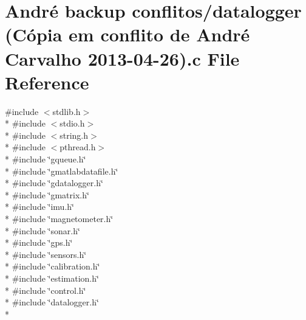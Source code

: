 \hypertarget{datalogger_01_07C_xC3_xB3pia_01em_01conflito_01de_01Andr_xC3_xA9_01Carvalho_012013-04-26_08_8c}{\section{André backup conflitos/datalogger (Cópia em conflito de André Carvalho 2013-\/04-\/26).c File Reference}
\label{datalogger_01_07C_xC3_xB3pia_01em_01conflito_01de_01Andr_xC3_xA9_01Carvalho_012013-04-26_08_8c}
}
{\ttfamily \#include $<$stdlib.\-h$>$}\\*
{\ttfamily \#include $<$stdio.\-h$>$}\\*
{\ttfamily \#include $<$string.\-h$>$}\\*
{\ttfamily \#include $<$pthread.\-h$>$}\\*
{\ttfamily \#include \char`\"{}gqueue.\-h\char`\"{}}\\*
{\ttfamily \#include \char`\"{}gmatlabdatafile.\-h\char`\"{}}\\*
{\ttfamily \#include \char`\"{}gdatalogger.\-h\char`\"{}}\\*
{\ttfamily \#include \char`\"{}gmatrix.\-h\char`\"{}}\\*
{\ttfamily \#include \char`\"{}imu.\-h\char`\"{}}\\*
{\ttfamily \#include \char`\"{}magnetometer.\-h\char`\"{}}\\*
{\ttfamily \#include \char`\"{}sonar.\-h\char`\"{}}\\*
{\ttfamily \#include \char`\"{}gps.\-h\char`\"{}}\\*
{\ttfamily \#include \char`\"{}sensors.\-h\char`\"{}}\\*
{\ttfamily \#include \char`\"{}calibration.\-h\char`\"{}}\\*
{\ttfamily \#include \char`\"{}estimation.\-h\char`\"{}}\\*
{\ttfamily \#include \char`\"{}control.\-h\char`\"{}}\\*
{\ttfamily \#include \char`\"{}datalogger.\-h\char`\"{}}\\*
